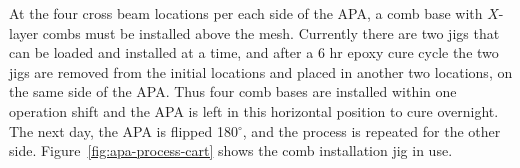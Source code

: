 


At the four cross beam locations per each side of the APA, a comb base with $X$-layer combs must be installed above the mesh.  Currently there are two jigs that can be loaded and installed at a time, and after a 6 hr epoxy cure cycle the two jigs are removed from the initial locations and placed in another two locations, on the same side of the APA.  Thus four comb bases are installed within one operation shift and the APA is left in this horizontal position to cure overnight.  The next day, the APA is flipped 180$^\circ$, and the process is repeated for the other side. Figure~\ref{fig:apa-process-cart} shows the comb installation jig in use.  %







